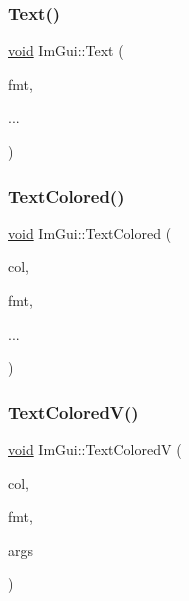 \mbox{\label{namespaceImGui_a9e7b83611fe441d54fad2effb4bf4965}} 
\subsubsection{\texorpdfstring{Text()}{Text()}}
{\footnotesize\ttfamily \hyperlink{imgui__impl__opengl3__loader_8h_ac668e7cffd9e2e9cfee428b9b2f34fa7}{void} Im\+Gui\+::\+Text (\begin{DoxyParamCaption}\item[{const char $\ast$}]{fmt,  }\item[{}]{... }\end{DoxyParamCaption})}

\mbox{\label{namespaceImGui_a36ab8fcad68b26863d6e910755de04c2}} 
\subsubsection{\texorpdfstring{Text\+Colored()}{TextColored()}}
{\footnotesize\ttfamily \hyperlink{imgui__impl__opengl3__loader_8h_ac668e7cffd9e2e9cfee428b9b2f34fa7}{void} Im\+Gui\+::\+Text\+Colored (\begin{DoxyParamCaption}\item[{const \hyperlink{structImVec4}{Im\+Vec4} \&}]{col,  }\item[{const char $\ast$}]{fmt,  }\item[{}]{... }\end{DoxyParamCaption})}

\mbox{\label{namespaceImGui_a87c24ece994188a7145d8feecb4439ed}} 
\subsubsection{\texorpdfstring{Text\+Colored\+V()}{TextColoredV()}}
{\footnotesize\ttfamily \hyperlink{imgui__impl__opengl3__loader_8h_ac668e7cffd9e2e9cfee428b9b2f34fa7}{void} Im\+Gui\+::\+Text\+ColoredV (\begin{DoxyParamCaption}\item[{const \hyperlink{structImVec4}{Im\+Vec4} \&}]{col,  }\item[{const char $\ast$}]{fmt,  }\item[{va\+\_\+list}]{args }\end{DoxyParamCaption})}

